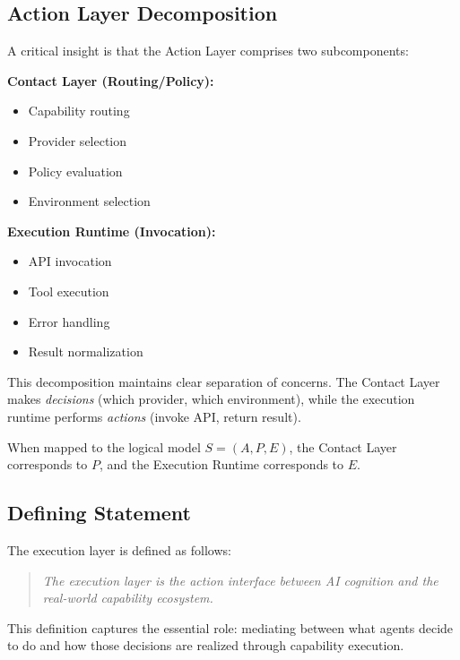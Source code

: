 \subsection{Action Layer Decomposition}

A critical insight is that the Action Layer comprises two subcomponents:

\textbf{Contact Layer (Routing/Policy):}
\begin{itemize}
    \item Capability routing
    \item Provider selection
    \item Policy evaluation
    \item Environment selection
\end{itemize}

\textbf{Execution Runtime (Invocation):}
\begin{itemize}
    \item API invocation
    \item Tool execution
    \item Error handling
    \item Result normalization
\end{itemize}

This decomposition maintains clear separation of concerns. The Contact Layer makes \emph{decisions} (which provider, which environment), while the execution runtime performs \emph{actions} (invoke API, return result).

When mapped to the logical model $S = (A, P, E)$, the Contact Layer corresponds to $P$, and the Execution Runtime corresponds to $E$.

\subsection{Defining Statement}

The execution layer is defined as follows:

\begin{quote}
\emph{The execution layer is the action interface between AI cognition and the real-world capability ecosystem.}
\end{quote}

This definition captures the essential role: mediating between what agents decide to do and how those decisions are realized through capability execution.
